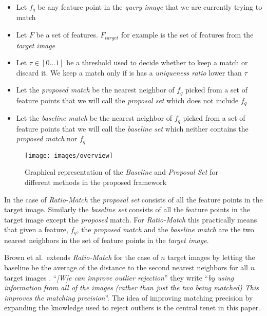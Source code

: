 \documentclass[journal]{IEEEtran}
\begin{document}
\begin{itemize}
\item{Let $f_q$ be any feature point in the \emph{query image} that we 
    are currently trying to match}
\item{Let $F$ be a set of features. $F_{target}$ for example is the set 
    of features from the \emph{target image}}
\item{Let $\tau \in [0 \ldots 1]$ be a threshold used to decide whether 
    to keep a match or discard it. We keep a match only if is has a 
\emph{uniqueness ratio} lower than $\tau$}
\item{Let the \emph{proposed match} be the nearest neighbor of $f_q$
    picked from a set of feature points that we will call the 
\emph{proposal set} which does not include $f_q$}
\item{Let the \emph{baseline match} be the nearest neighbor of $f_q$ 
    picked from a set of feature points that we will call the 
\emph{baseline set} which neither contains the \emph{proposed match} nor 
$f_q$}
\end{itemize}

\begin{figure}[b]
\centering
\texttt{[image: images/overview]}
\caption{Graphical representation of the \emph{Baseline} and 
\emph{Proposal Set} for different methods in the proposed framework}
\label{fig:overview}
\end{figure}

In the case of \emph{Ratio-Match} \cite{lowe2004sift} the \emph{proposal 
set} consists of all the feature points in the target image.  Similarly 
the \emph{baseline set} consists of all the feature points in the target 
image except the \emph{proposed} match. For \emph{Ratio-Match} this 
practically means that given a feature, $f_q$, the \emph{proposed match} 
and the \emph{baseline match} are the two nearest neighbors in the set 
of feature points in the \emph{target image}.

Brown et al.\ extends \emph{Ratio-Match} for the case of $n$ target 
images by letting the baseline be the average of the distance to the 
second nearest neighbors for all $n$ target images 
\cite{brown2005multi}.  ``\emph{[W]e can improve outlier rejection}'' 
they write ``\emph{by using information from all of the images (rather 
than just the two being matched) This improves the matching 
precision}''.  The idea of improving matching precision by expanding the 
knowledge used to reject outliers is the central tenet in this paper.
\end{document}
